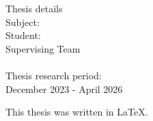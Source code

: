 \pagestyle{empty}
\hspace{10pt}
\begin{center}
\Large{Thesis details}\\[1cm]
{\large Subject:}
\textbf{\large \doctitle}\\[1cm]
\large {Student: \textbf{\nomme}\\[1cm]
\large{Supervising Team}\\
\textbf{\suptitle \, \supname}\\[1cm]
Thesis research period:\\ December 2023 - April 2026\\[1cm]}
\end{center}

\vspace{30em}

\begin{center}
  { \large
    This thesis was written in \LaTeX.\\
  }
\end{center}

